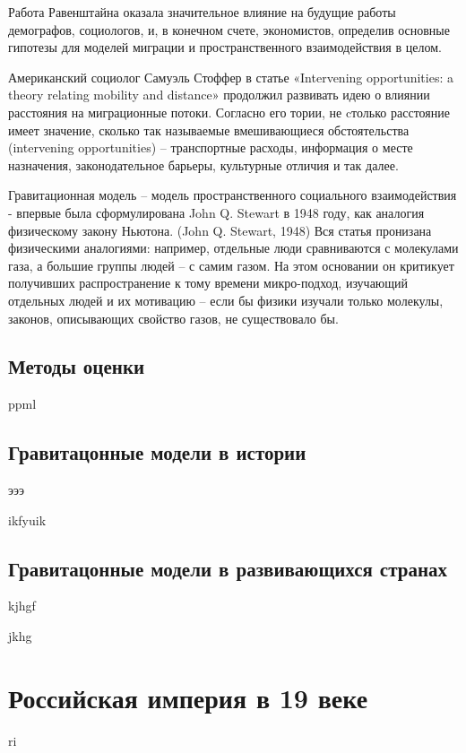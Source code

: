 \documentclass[a4paper,12pt]{article}
\begin{document}
Работа Равенштайна оказала значительное влияние на будущие работы демографов, социологов, и, в конечном счете, экономистов, определив основные гипотезы для моделей миграции и пространственного взаимодействия в целом. 

Американский социолог Самуэль Стоффер в статье «Intervening opportunities: a theory relating mobility and distance» продолжил развивать идею о влиянии расстояния на миграционные потоки. Согласно его тории, не cтолько расстояние имеет значение, сколько так называемые вмешивающиеся обстоятельства (intervening opportunities) – транспортные расходы, информация о месте назначения, законодательное барьеры, культурные отличия и так далее.

Гравитационная модель – модель пространственного социального взаимодействия - впервые была сформулирована John Q. Stewart в 1948 году, как аналогия физическому закону Ньютона. (John Q. Stewart, 1948) Вся статья пронизана физическими аналогиями: например, отдельные люди сравниваются с молекулами газа, а большие группы людей – с самим газом. На этом основании он критикует получивших распространение к тому времени микро-подход, изучающий отдельных людей и их мотивацию – если бы физики изучали только молекулы, законов, описывающих свойство газов, не существовало бы.


\subsection{Методы оценки}

ppml

\subsection{Гравитацонные модели в истории}

эээ

ikfyuik

\subsection{Гравитацонные модели в развивающихся странах}

kjhgf

jkhg

\clearpage
\section{Российская империя в 19 веке}

ri
\end{document}
